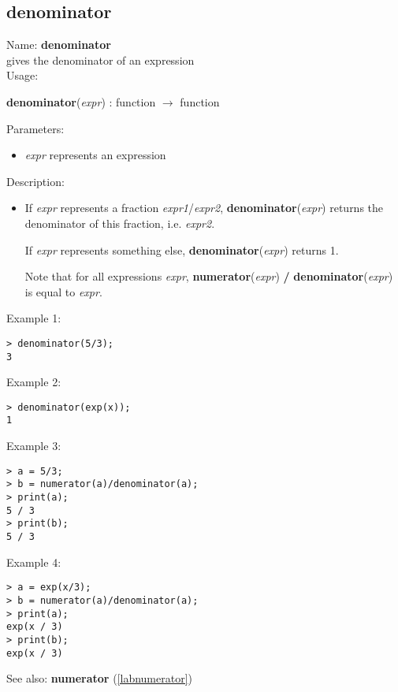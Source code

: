 \subsection{denominator}
\label{labdenominator}
\noindent Name: \textbf{denominator}\\
gives the denominator of an expression\\

\noindent Usage: 
\begin{center}
\textbf{denominator}(\emph{expr}) : \textsf{function} $\rightarrow$ \textsf{function}\\
\end{center}
Parameters: 
\begin{itemize}
\item \emph{expr} represents an expression
\end{itemize}
\noindent Description: \begin{itemize}

\item If \emph{expr} represents a fraction \emph{expr1}/\emph{expr2}, \textbf{denominator}(\emph{expr})
   returns the denominator of this fraction, i.e. \emph{expr2}.
    
   If \emph{expr} represents something else, \textbf{denominator}(\emph{expr}) 
   returns 1.
    
   Note that for all expressions \emph{expr}, \textbf{numerator}(\emph{expr}) \textbf{/} \textbf{denominator}(\emph{expr})
   is equal to \emph{expr}.
\end{itemize}
\noindent Example 1: 
\begin{center}\begin{minipage}{15cm}\begin{Verbatim}[frame=single]
> denominator(5/3);
3
\end{Verbatim}
\end{minipage}\end{center}
\noindent Example 2: 
\begin{center}\begin{minipage}{15cm}\begin{Verbatim}[frame=single]
> denominator(exp(x));
1
\end{Verbatim}
\end{minipage}\end{center}
\noindent Example 3: 
\begin{center}\begin{minipage}{15cm}\begin{Verbatim}[frame=single]
> a = 5/3;
> b = numerator(a)/denominator(a);
> print(a);
5 / 3
> print(b);
5 / 3
\end{Verbatim}
\end{minipage}\end{center}
\noindent Example 4: 
\begin{center}\begin{minipage}{15cm}\begin{Verbatim}[frame=single]
> a = exp(x/3);
> b = numerator(a)/denominator(a);
> print(a);
exp(x / 3)
> print(b);
exp(x / 3)
\end{Verbatim}
\end{minipage}\end{center}
See also: \textbf{numerator} (\ref{labnumerator})
